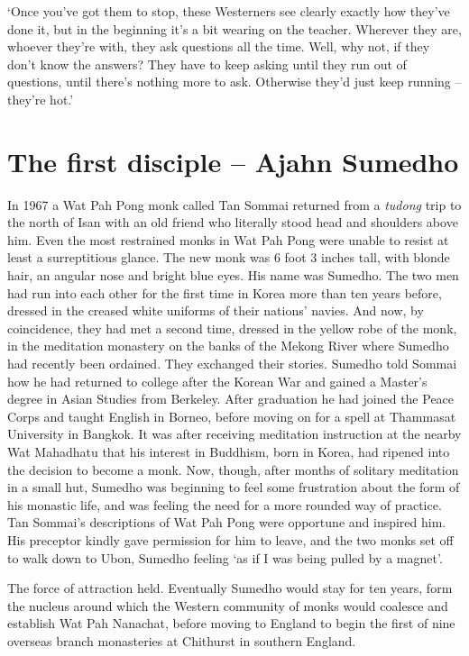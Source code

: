 `Once you've got them to stop, these Westerners see clearly exactly how
they've done it, but in the beginning it's a bit wearing on the teacher. 
Wherever they are, whoever they're with, they ask questions all the
time. Well, why not, if they don't know the answers? They have to keep
asking until they run out of questions, until there's nothing more to
ask. Otherwise they'd just keep running -- they're hot.'

\section{The first disciple -- Ajahn Sumedho}

In 1967 a Wat Pah Pong monk called Tan Sommai returned from a
\emph{tudong} trip to the north of Isan with an old friend who literally
stood head and shoulders above him. Even the most restrained monks in
Wat Pah Pong were unable to resist at least a surreptitious glance. The
new monk was 6 foot 3 inches tall, with blonde hair, an angular nose and
bright blue eyes. His name was Sumedho. The two men had run into each
other for the first time in Korea more than ten years before, dressed in
the creased white uniforms of their nations' navies. And now, by
coincidence, they had met a second time, dressed in the yellow robe of
the monk, in the meditation monastery on the banks of the Mekong River
where Sumedho had recently been ordained. They exchanged their stories. 
Sumedho told Sommai how he had returned to college after the Korean War
and gained a Master's degree in Asian Studies from Berkeley. After
graduation he had joined the Peace Corps and taught English in Borneo, 
before moving on for a spell at Thammasat University in Bangkok. It was
after receiving meditation instruction at the nearby Wat Mahadhatu that
his interest in Buddhism, born in Korea, had ripened into the decision
to become a monk. Now, though, after months of solitary meditation in a
small hut, Sumedho was beginning to feel some frustration about the form
of his monastic life, and was feeling the need for a more rounded way of
practice. Tan Sommai's descriptions of Wat Pah Pong were opportune and
inspired him. His preceptor kindly gave permission for him to leave, and
the two monks set off to walk down to Ubon, Sumedho feeling `as if I was
being pulled by a magnet'. 

The force of attraction held. Eventually Sumedho would stay for ten
years, form the nucleus around which the Western community of monks
would coalesce and establish Wat Pah Nanachat, before moving to
England to begin the first of nine overseas branch monasteries at
Chithurst in southern England. 

